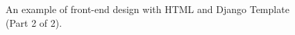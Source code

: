 \begin{figure}[H]
	\centering
	\caption{An example of front-end design with HTML and Django Template (Part 2 of 2).}
	\label{fig:dvt2}
\end{figure}
